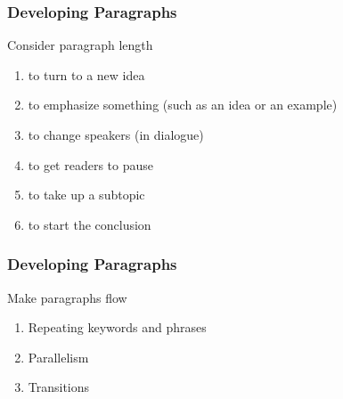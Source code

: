 \documentclass{beamer}
\begin{document}
\begin{frame}
\frametitle{Developing Paragraphs}
\begin{block}{Consider paragraph length}
\begin{enumerate}
\item to turn to a new idea 
\item to emphasize something (such as an idea or an example) 
\item to change speakers (in dialogue)
\item to get readers to pause 
\item to take up a subtopic 
\item to start the conclusion
\end{enumerate}
\end{block}
\end{frame}
\begin{frame}
\frametitle{Developing Paragraphs}
\begin{block}{Make paragraphs flow}
\begin{enumerate}
\item Repeating keywords and phrases
\item Parallelism
\item Transitions
\end{enumerate}
\end{block}
\end{frame}
\end{document}
